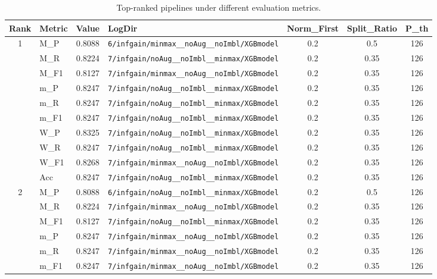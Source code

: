 \begin{table}[htbp]
\caption{Top-ranked pipelines under different evaluation metrics.}
\label{tab:rank_metric_vertical}
\centering
\small
\setlength{\tabcolsep}{4pt}
\begin{tabular}{|c|l|c|>{\ttfamily\footnotesize}p{7.2cm}|c|c|c|}
\hline
Rank & Metric & Value & LogDir & Norm\_First & Split\_Ratio & P\_th \\
\hline
\multirow{10}{*}{1} & M\_P & 0.8088 & \texttt{6/infgain/minmax\_\_noAug\_\_noImbl/XGBmodel} & 0.2 & 0.5  & 126 \\ 
 & M\_R & 0.8224 & \texttt{7/infgain/noAug\_\_noImbl\_\_minmax/XGBmodel} & 0.2 & 0.35  & 126 \\ 
 & M\_F1 & 0.8127 & \texttt{7/infgain/minmax\_\_noAug\_\_noImbl/XGBmodel} & 0.2 & 0.35  & 126 \\ 
 & m\_P & 0.8247 & \texttt{7/infgain/noAug\_\_noImbl\_\_minmax/XGBmodel} & 0.2 & 0.35  & 126 \\ 
 & m\_R & 0.8247 & \texttt{7/infgain/noAug\_\_noImbl\_\_minmax/XGBmodel} & 0.2 & 0.35  & 126 \\ 
 & m\_F1 & 0.8247 & \texttt{7/infgain/noAug\_\_noImbl\_\_minmax/XGBmodel} & 0.2 & 0.35  & 126 \\ 
 & W\_P & 0.8325 & \texttt{7/infgain/noAug\_\_noImbl\_\_minmax/XGBmodel} & 0.2 & 0.35  & 126 \\ 
 & W\_R & 0.8247 & \texttt{7/infgain/noAug\_\_noImbl\_\_minmax/XGBmodel} & 0.2 & 0.35  & 126 \\ 
 & W\_F1 & 0.8268 & \texttt{7/infgain/minmax\_\_noAug\_\_noImbl/XGBmodel} & 0.2 & 0.35  & 126 \\ 
 & Acc & 0.8247 & \texttt{7/infgain/noAug\_\_noImbl\_\_minmax/XGBmodel} & 0.2 & 0.35  & 126 \\ 
\hline
\multirow{10}{*}{2} & M\_P & 0.8088 & \texttt{6/infgain/noAug\_\_noImbl\_\_minmax/XGBmodel} & 0.2 & 0.5  & 126 \\ 
 & M\_R & 0.8224 & \texttt{7/infgain/minmax\_\_noAug\_\_noImbl/XGBmodel} & 0.2 & 0.35  & 126 \\ 
 & M\_F1 & 0.8127 & \texttt{7/infgain/noAug\_\_noImbl\_\_minmax/XGBmodel} & 0.2 & 0.35  & 126 \\ 
 & m\_P & 0.8247 & \texttt{7/infgain/minmax\_\_noAug\_\_noImbl/XGBmodel} & 0.2 & 0.35  & 126 \\ 
 & m\_R & 0.8247 & \texttt{7/infgain/minmax\_\_noAug\_\_noImbl/XGBmodel} & 0.2 & 0.35  & 126 \\ 
 & m\_F1 & 0.8247 & \texttt{7/infgain/minmax\_\_noAug\_\_noImbl/XGBmodel} & 0.2 & 0.35  & 126 \\ 

\end{tabular}
\end{table}
